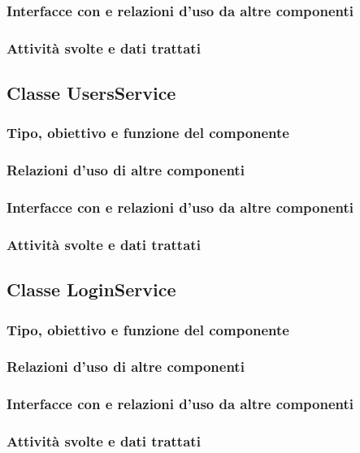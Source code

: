 \subsubsection*{Interfacce con e relazioni d'uso da altre componenti}
\subsubsection*{Attivit\`a svolte e dati trattati}

\subsection{Classe UsersService}
\subsubsection*{Tipo, obiettivo e funzione del componente}
\subsubsection*{Relazioni d'uso di altre componenti}
\subsubsection*{Interfacce con e relazioni d'uso da altre componenti}
\subsubsection*{Attivit\`a svolte e dati trattati}

\subsection{Classe LoginService}
\subsubsection*{Tipo, obiettivo e funzione del componente}
\subsubsection*{Relazioni d'uso di altre componenti}
\subsubsection*{Interfacce con e relazioni d'uso da altre componenti}
\subsubsection*{Attivit\`a svolte e dati trattati}

